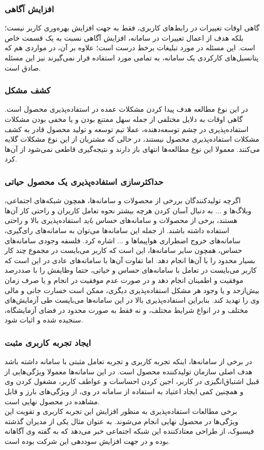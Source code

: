 \subsubsection{افزایش آگاهی}
گاهی اوقات تغییرات در رابط‌های کاربری، فقط به جهت افزایش بهره‌وری کاربر نیست؛ بلکه هدف از اعمال تغییرات در سامانه، افزایش آگاهی نسبت به یک قسمت خاص است. این مسئله در مورد تبلیغات برخط درست است؛ علاوه بر آن، در مواردی هم که پتانسیل‌های کارکردی یک سامانه، به تمامی مورد استفاده قرار نمی‌گیرند نیز این مسئله صادق است.
\subsubsection{کشف مشکل}
در این نوع مطالعه هدف پیدا کردن مشکلات عمده در استفاده‌پذیری محصول است. گاهی اوقات به دلایل مختلفی از جمله سهل ممتنع بودن و یا مخفی بودن مشکلات استفاده‌پذیری در چشم توسعه‌دهنده، عملا تیم توسعه و تولید محصول قادر به کشف مشکلات استفاده‌پذیری محصول نیستند، در حالی که مشتریان از این نوع مشکلات گلایه می‌کنند. معمولا این نوع مطالعه‌ها انتهای باز دارند و نتیجه‌گیری قاطعی نمی‌شود از آن‌ها کرد.
\subsubsection{حداکثرسازی استفاده‌پذیری یک محصول حیاتی}
اگرچه تولیدکنندگان بررخی از محصولات و سامانه‌ها، همچون شبکه‌های اجتماعی، وبلاگ‌ها و ... به دنبال آسان کردن هرچه بیشتر نحوه تعامل کاربران و راحتی کار آن‌ها هستند، برخی از محصولات و سامانه‌های حساس
\emph{باید}
استفاده‌پذیری بالا و راحتی استفاده داشته باشند. از جمله این سامانه‌ها می‌توان به سامانه‌های رای‌گیری، سامانه‌های خروج اضطراری هواپیماها و ... اشاره کرد. فلسفه وجودی سامانه‌های حساس، همچون سایر سامانه‌ها، این است که کاربر می‌بایست در مجموع چند کار بسیار محدود را با آن‌ها انجام دهد. اما تفاوت آن‌ها با سامانه‌های عادی در این است که کاربر می‌بایست در تعامل با سامانه‌های حساس و حیاتی، حتما وظایفش را با صددرصد موفقیت و اطمینان انجام دهد و در صورت عدم موفقیت در انجام و یا صرف زمان بیش‌از‌حد و یا وجود هر مشکل استفاده‌پذیری دیگری، ممکن است خسارت جانی و مالی وی را تهدید کند. بنابراین استفاده‌پذیری بالا در این سامانه‌ها می‌بایست طی آزمایش‌های مختلف و در انواع شرایط مختلف، و نه فقط به صورت محدود در فضای آزمایشگاه، سنجیده شده و اثبات شود.
\subsubsection{ایجاد تجربه کاربری مثبت}
در برخی از سامانه‌ها، اینکه تجربه کاربری و تجربه تعامل مثبتی با سامانه داشته باشد هدف اصلی سازمان تولیدکننده محصول است. در این سامانه‌ها معمولا ویژگی‌هایی از قبیل اشتیاق‌انگیزی در کاربر، اجین کردن احساسات و عواطف کاربر، مشغول کردن وی و همچنین کمی ایجاد اعتیاد به استفاده از سامانه در وی، از ویژگی‌های بارز و قابل مشاهده در محصول نهایی است.\\
برخی مطالعات استفاده‌پذیری به منظور افزایش این تجربه کاربری و تقویت این ویژگی‌ها در محصول نهایی انجام می‌شوند. به عنوان مثال یکی از مدیران گذشته فیسبوک، از طراحی معتادکننده این شبکه اجتماعی خبر می‌دهد
\cite{noauthor_sean_nodate}
که به گفته وی آگاهانه بوده و در جهت افزایش سوددهی این شرکت بوده است.
